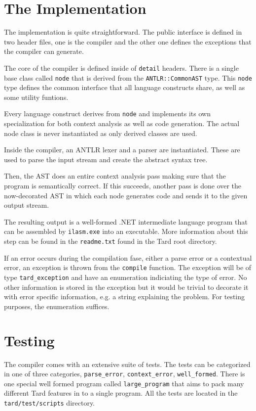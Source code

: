 \documentclass{report}
\begin{document}
\chapter{The Implementation}

The implementation is quite straightforward. The public interface is
defined in two header files, one is the compiler and the other one
defines the exceptions that the compiler can generate.

The core of the compiler is defined inside of \texttt{detail}
headers. There is a single base class called \texttt{node} that is
derived from the \texttt{ANTLR::CommonAST} type. This \texttt{node}
type defines the common interface that all language constructs
share, as well as some utility funtions.

Every language construct derives from \texttt{node} and implements
its own specialization for both context analysis as well as code
generation. The actual node class is never instantiated as only
derived classes are used.

Inside the compiler, an ANTLR lexer and a parser are instantiated.
These are used to parse the input stream and create the abstract
syntax tree.

Then, the AST does an entire context analysis pass making sure that
the program is semantically correct. If this succeeds, another pass
is done over the now-decorated AST in which each node generates code
and sends it to the given output stream.

The resulting output is a well-formed .NET intermediate language
program that can be assembled by \texttt{ilasm.exe} into an
executable. More information about this step can be found in the
\texttt{readme.txt} found in the Tard root directory.

If an error occurs during the compilation fase, either a parse error
or a contextual error, an exception is thrown from the
\texttt{compile} function. The exception will be of type
\texttt{tard\_exception} and have an enumeration indiciating the
type of error. No other information is stored in the exception but
it would be trivial to decorate it with error specific information,
e.g. a string explaining the problem. For testing purposes, the
enumeration suffices.

\chapter{Testing}

The compiler comes with an extensive suite of tests. The tests can
be categorized in one of three categories, \texttt{parse\_error},
\texttt{context\_error}, \texttt{well\_formed}. There is one special
well formed program called \texttt{large\_program} that aims to pack
many different Tard features in to a single program. All the tests
are located in the \texttt{tard/test/scripts} directory.
\end{document}
